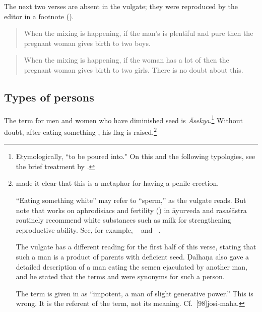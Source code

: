\begin{translation}
{The next two verses are absent in the vulgate; they were reproduced by the 
editor in a footnote (\cite[348b, n.\,3]{vulgate}).}

\item [37.1]
\begin{quote}
    When the mixing is happening, if the man's  is plentiful 
    and pure then the pregnant woman gives birth to two boys.
\end{quote}

\item [37.2]

\begin{quote}
    When the mixing is happening, if the woman has a lot of 
     then the pregnant woman gives birth to two girls.
    There is no doubt about this. 
\end{quote}

\subsection{Types of persons}

\item[38]

The term for men and women who have diminished seed is
\emph{Āsekya}.\footnote{Etymologically, “to be poured into."  On this and the
    following typologies, see the brief treatment by
    \citet[216--217]{meul-1997}.}  Without doubt, after eating something
    , his flag is raised.\footnote{
        made it clear that this is a metaphor for having a penile
        erection.\label{erection}

“Eating something white” may refer to  “sperm,” as the
vulgate reads.  But note that works on aphrodisiacs and fertility
() in āyurveda and rasaśāstra routinely recommend
white substances such as milk for strengthening reproductive ability.
See, for example, \SS\  and \CS\ .

The vulgate has a different reading for the first half of this verse, stating that 
such a man is a product of parents with deficient seed.  Ḍalhaṇa also gave a 
detailed description of a man eating the semen ejaculated by another man, 
and he stated that the terms  and  were 
synonyms for such a person.

The term  is given in \cite[161]{moni-sans} as “impotent,
a man of slight generative power.”  This is wrong.  It is the
referent of the term, not its meaning. Cf.\ [98]{josi-maha}.

}
\end{translation}
